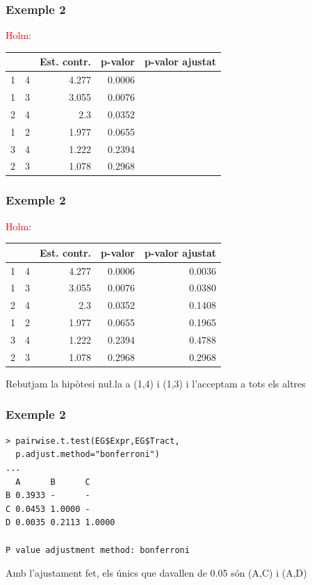 \documentclass[12pt,t]{beamer}
\newcommand{\red}[1]{\textcolor{red}{#1}}
\theoremstyle{plain}
\theoremstyle{definition}
\begin{document}
\begin{frame} 
\frametitle{Exemple 2}


\red{Holm}: 
\begin{center}
\begin{tabular}{r|r|r|r|r|}
& & Est. contr. & p-valor & p-valor ajustat\\
\hline
1 & 4 & 4.277 & 0.0006 & \hphantom{0.0036}\\
1 & 3 & 3.055 & 0.0076 & \\
2 &4 & 2.3 & 0.0352 &  \\
1 & 2 & 1.977 & 0.0655  &  \\
3 & 4 & 1.222 & 0.2394 & \\
2 & 3 & 1.078 & 0.2968 & \\
\end{tabular}
\end{center}

\end{frame}


\begin{frame} 
\frametitle{Exemple 2}

\red{Holm}: 
\begin{center}
\begin{tabular}{r|r|r|r|r|}
& & Est. contr. & p-valor & p-valor ajustat\\
\hline
1 & 4 & 4.277 & 0.0006 & 0.0036\\
1 & 3 & 3.055 & 0.0076 & 0.0380\\
2 &4 & 2.3 & 0.0352 & 0.1408 \\
1 & 2 & 1.977 & 0.0655  & 0.1965 \\
3 & 4 & 1.222 & 0.2394 & 0.4788\\
2 & 3 & 1.078 & 0.2968 & 0.2968\\
\end{tabular}
\end{center}

Rebutjam la hipòtesi nu\l.la a (1,4) i (1,3) i l'acceptam a tots els altres
\end{frame}


\begin{frame}[fragile]
\frametitle{Exemple 2}
\vspace*{-3ex}

\begin{verbatim}
> pairwise.t.test(EG$Expr,EG$Tract,
  p.adjust.method="bonferroni")
...
  A      B      C     
B 0.3933 -      -     
C 0.0453 1.0000 -     
D 0.0035 0.2113 1.0000

P value adjustment method: bonferroni 
\end{verbatim}
Amb l'ajustament fet, els únics que davallen de 0.05 són (A,C) i (A,D)

\end{frame}
\end{document}
